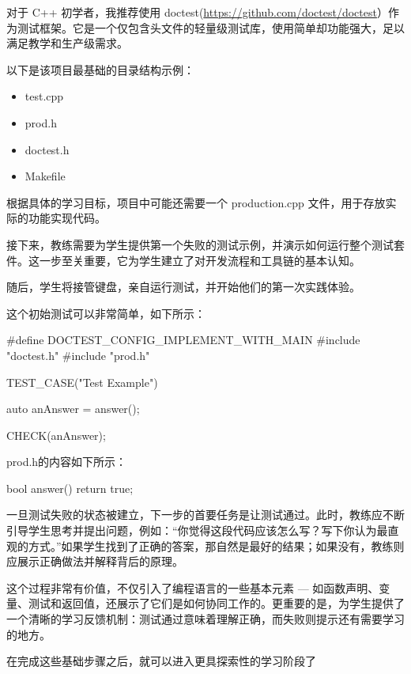 对于 C++ 初学者，我推荐使用 doctest(\url{https://github.com/doctest/doctest}）作为测试框架。它是一个仅包含头文件的轻量级测试库，使用简单却功能强大，足以满足教学和生产级需求。

以下是该项目最基础的目录结构示例：

\begin{itemize}
\item 
test.cpp

\item 
prod.h

\item 
doctest.h 

\item 
Makefile
\end{itemize}

根据具体的学习目标，项目中可能还需要一个 production.cpp 文件，用于存放实际的功能实现代码。

接下来，教练需要为学生提供第一个失败的测试示例，并演示如何运行整个测试套件。这一步至关重要，它为学生建立了对开发流程和工具链的基本认知。

随后，学生将接管键盘，亲自运行测试，并开始他们的第一次实践体验。

这个初始测试可以非常简单，如下所示：

\begin{cpp}
#define DOCTEST_CONFIG_IMPLEMENT_WITH_MAIN
#include "doctest.h"
#include "prod.h"

TEST_CASE("Test Example"){
  auto anAnswer = answer();

  CHECK(anAnswer);
}
\end{cpp}

prod.h的内容如下所示：

\begin{cpp}
bool answer(){
  return true;
}
\end{cpp}

一旦测试失败的状态被建立，下一步的首要任务是让测试通过。此时，教练应不断引导学生思考并提出问题，例如：“你觉得这段代码应该怎么写？写下你认为最直观的方式。”如果学生找到了正确的答案，那自然是最好的结果；如果没有，教练则应展示正确做法并解释背后的原理。

这个过程非常有价值，不仅引入了编程语言的一些基本元素 --- 如函数声明、变量、测试和返回值，还展示了它们是如何协同工作的。更重要的是，为学生提供了一个清晰的学习反馈机制：测试通过意味着理解正确，而失败则提示还有需要学习的地方。

在完成这些基础步骤之后，就可以进入更具探索性的学习阶段了



